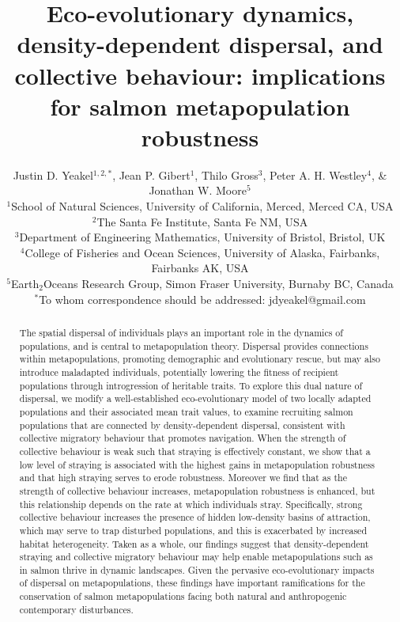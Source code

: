 \documentclass{revtex4}
\begin{document}
\title{Eco-evolutionary dynamics, density-dependent dispersal, and collective behaviour: implications for salmon metapopulation robustness}
\author{
Justin D. Yeakel${}^{1,2,*}$, Jean P. Gibert${}^{1}$, Thilo Gross${}^3$, Peter A. H. Westley${}^{4}$, \& Jonathan W. Moore${}^{5}$ \\
${}^1$School of Natural Sciences, University of California, Merced, Merced CA, USA \\
${}^2$The Santa Fe Institute, Santa Fe NM, USA \\
${}^3$Department of Engineering Mathematics, University of Bristol, Bristol, UK\\
${}^4$College of Fisheries and Ocean Sciences, University of Alaska, Fairbanks, Fairbanks AK, USA \\
${}^5$Earth${}_2$Oceans Research Group, Simon Fraser University, Burnaby BC, Canada \\
${}^*$To whom correspondence should be addressed: jdyeakel@gmail.com
}




\begin{abstract} %
The spatial dispersal of individuals plays an important role in the dynamics of populations, and is central to metapopulation theory. Dispersal provides connections within metapopulations, promoting demographic and evolutionary rescue, but may also introduce maladapted individuals, potentially lowering the fitness of recipient populations through introgression of heritable traits. To explore this dual nature of dispersal, we modify a well-established eco-evolutionary model of two locally adapted populations and their associated mean trait values, to examine recruiting salmon populations that are connected by density-dependent dispersal, consistent with collective migratory behaviour that promotes navigation. When the strength of collective behaviour is weak such that straying is effectively constant, we show that a low level of straying is associated with the highest gains in metapopulation robustness and that high straying serves to erode robustness. Moreover we find that as the strength of collective behaviour increases, metapopulation robustness is enhanced, but this relationship depends on the rate at which individuals stray. Specifically, strong collective behaviour increases the presence of hidden low-density basins of attraction, which may serve to trap disturbed populations, and this is exacerbated by increased habitat heterogeneity. Taken as a whole, our findings suggest that density-dependent straying and collective migratory behaviour may help enable metapopulations such as in salmon thrive in dynamic landscapes. Given the pervasive eco-evolutionary impacts of dispersal on metapopulations, these findings have important ramifications for the conservation of salmon metapopulations facing both natural and anthropogenic contemporary disturbances.
\end{abstract} 
\end{document}
